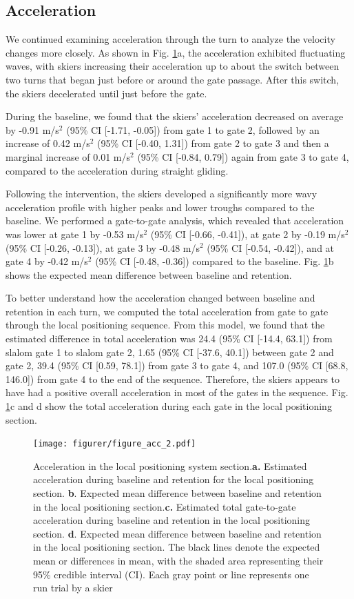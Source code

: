 \subsection{Acceleration}
We continued examining acceleration through the turn to analyze the velocity changes more closely. As shown in Fig. \ref{fig: acc}a, the acceleration exhibited fluctuating waves, with skiers increasing their acceleration up to about the switch between two turns that began just before or around the gate passage. After this switch, the skiers decelerated until just before the gate. 

During the baseline, we found that the skiers' acceleration decreased on average by -0.91 m/s$^2$ (95\% CI [-1.71, -0.05]) from gate 1 to gate 2, followed by an increase of 0.42 m/s$^2$ (95\% CI [-0.40, 1.31]) from gate 2 to gate 3 and then a marginal increase of 0.01 m/s$^2$ (95\% CI [-0.84, 0.79]) again from gate 3 to gate 4, compared to the acceleration during straight gliding.

Following the intervention, the skiers developed a significantly more wavy acceleration profile with higher peaks and lower troughs compared to the baseline. We performed a gate-to-gate analysis, which revealed that acceleration was lower at gate 1 by -0.53  m/s$^2$ (95\% CI [-0.66, -0.41]), at gate 2 by -0.19  m/s$^2$ (95\% CI [-0.26, -0.13]), at gate 3 by -0.48  m/s$^2$ (95\% CI [-0.54, -0.42]), and at gate 4 by -0.42  m/s$^2$  (95\% CI [-0.48, -0.36]) compared to the baseline. Fig. \ref{fig: acc}b shows the expected mean difference between baseline and retention. 

To better understand how the acceleration changed between baseline and retention in each turn, we computed the total acceleration from gate to gate through the local positioning sequence. From this model, we found that the estimated difference in total acceleration was 24.4 (95\% CI [-14.4, 63.1]) from slalom gate 1 to slalom gate 2, 1.65 (95\% CI [-37.6, 40.1]) between gate 2 and gate 2, 39.4 (95\% CI [0.59, 78.1]) from gate 3 to gate 4, and 107.0 (95\% CI [68.8, 146.0]) from gate 4 to the end of the sequence. Therefore, the skiers appears to have had a positive overall acceleration in most of the gates in the sequence. Fig. \ref{fig: acc}c and d show the total acceleration during each gate in the local positioning section.

\begin{figure}[H]
\centering
\texttt{[image: figurer/figure\_acc\_2.pdf]}
\caption{Acceleration in the local positioning system section.\textbf{a.} Estimated acceleration during baseline and retention for the local positioning section. \textbf{b}. Expected mean difference between baseline and retention in the local positioning section.\textbf{c.} Estimated total gate-to-gate acceleration during baseline and retention in the local positioning section. \textbf{d}. Expected mean difference between baseline and retention in the local positioning section. The black lines denote the expected mean or differences in mean, with the shaded area representing their 95\% credible interval (CI). Each gray point or line represents one run trial by a skier}\label{fig: acc}
\end{figure}

